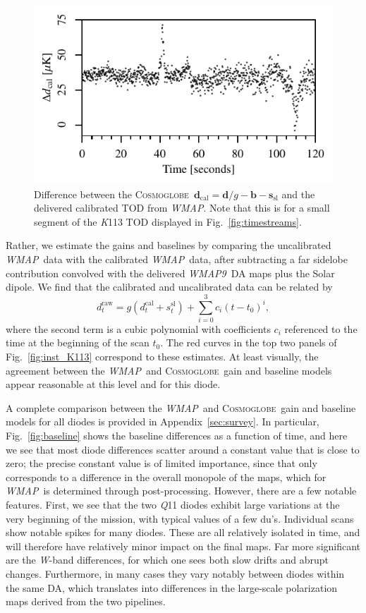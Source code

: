 \documentclass[twocolumn]{../../common/aa}
\def\WMAP{\emph{WMAP}}
\def\WMAPnine{\emph{WMAP9}}
\newcommand{\cosmoglobe}{\textsc{Cosmoglobe}}
\newcommand{\K}[0]{\textit K}
\newcommand{\Q}[0]{\textit Q}
\newcommand{\W}[0]{\textit W}
\begin{document}
\begin{figure}
	\includegraphics[width=\columnwidth]{figures/K113_TOD_diff_10min.pdf}
	\caption{Difference between the \cosmoglobe\ $\boldsymbol d_\mathrm{cal}=\boldsymbol d/g-\boldsymbol b - \boldsymbol s_\mathrm{sl}$ and the delivered calibrated TOD from \WMAP. Note that this is for a small segment of the \K113 TOD displayed in Fig.~\ref{fig:timestreams}.}
	\label{fig:cal_comp_10min}
\end{figure}


Rather, we estimate the gains and baselines by comparing the uncalibrated \WMAP\ data with the calibrated \WMAP\ data, after subtracting a far sidelobe contribution convolved with the delivered \WMAPnine\ DA maps plus the Solar dipole.  We find that the calibrated and uncalibrated data can be related by
\begin{equation}
	d^\mathrm{raw}_t=g(d^\mathrm{cal}_t+s^\mathrm{sl}_t)+\sum_{i=0}^3c_i(t-t_0)^i,
\end{equation}
where the second term is a cubic polynomial with coefficients $c_i$ referenced to the time at the beginning of the scan $t_0$. The red curves in the top two panels of Fig.~\ref{fig:inst_K113} correspond to these estimates. At least visually, the agreement between the \WMAP\ and \cosmoglobe\ gain and baseline models appear reasonable at this level and for this diode.

A complete comparison between the  \WMAP\ and \cosmoglobe\ gain and baseline models for all diodes is provided in Appendix~\ref{sec:survey}. In particular, Fig.~\ref{fig:baseline} shows the baseline differences as a function of time, and here we see that most diode differences scatter around a constant value that is close to zero; the precise constant value is of limited importance, since that only corresponds to a difference in the overall monopole of the maps, which for \WMAP\ is determined through post-processing. However, there are a few notable features. First, we see that the two \Q11 diodes exhibit large variations at the very beginning of the mission, with typical values of a few du's. Individual scans show notable spikes for many diodes. These are all relatively isolated in time, and will therefore have relatively minor impact on the final maps. Far more significant are the \W-band differences, for which one sees both slow drifts and abrupt changes. Furthermore, in many cases they vary notably between diodes within the same DA, which translates into differences in the large-scale polarization maps derived from the two pipelines.
\end{document}
